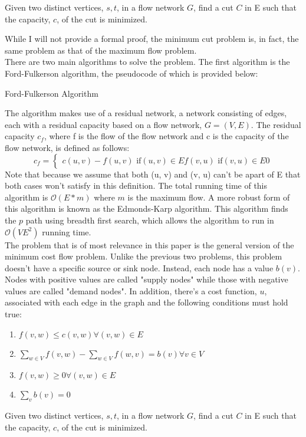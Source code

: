 \documentclass[11pt]{article}
\begin{document}
\begin{tcolorbox}
	Given two distinct vertices, $s, t$, in a flow network $G$, find  a cut $C$ in E such that the capacity, $c$, of the cut is minimized.  
\end{tcolorbox}
While I will not provide a formal proof, the minimum cut problem is, in fact, the same problem as that of the maximum flow problem. \\
There are two main algorithms to solve the problem. The first algorithm is the Ford-Fulkerson algorithm, the pseudocode of which is provided below: \\
\begin{algorithm}[H]
\caption{Ford-Fulkerson Algorithm}
\begin{algorithmic}
\EndFor
{}
\Else 
{}
\EndIf
\EndFor
\EndWhile
\end{algorithmic}
\end{algorithm}
The algorithm makes use of a residual network, a network consisting of edges, each with a residual capacity based on a flow network, $G=(V, E)$. The residual capacity $c_f$, where f is the flow of the flow network and c is the capacity of the flow network, is defined as follows:\\ 
\[
c_f = \begin{cases}
c(u, v) - f(u, v)\text{ if}  (u, v) \in E
f(v, u) \text{ if} (v, u) \in E
0
\end{cases}
\]
Note that because we assume that both (u, v) and (v, u) can't be apart of E that both cases won't satisfy in this definition. 
The total running time of this algorithm is $\mathcal{O}(E*m)$ where $m$ is the maximum flow. A more robust form of this algorithm is known as the Edmonds-Karp algorithm. This algorithm finds the $p$ path using breadth first search, which allows the algorithm to run in $\mathcal{O}(VE^2)$ running time. \\
The problem that is of most relevance in this paper is the general version of the minimum cost flow problem. Unlike the previous two problems, this problem doesn't have a specific source or sink node. Instead, each node has a value $b(v)$. Nodes with positive values are called "supply nodes" while those with negative values are called "demand nodes". In addition, there's a cost function, $u$, associated with each edge in the graph and the following conditions must hold true: 
\begin{enumerate}
\item $f(v, w) \leq c(v, w) \forall(v, w) \in E$ 
\item $\sum_{w \in V}{f(v, w)} - \sum_{w \in V}{f(w, v)} = b(v) \forall v \in V$
\item $f(v, w) \geq 0 \forall(v, w) \in E$ 
\item $\sum_{v}{b(v)} = 0$
\end{enumerate}
\begin{tcolorbox}
Given two distinct vertices, $s, t$, in a flow network $G$, find  a cut $C$ in E such that the capacity, $c$, of the cut is minimized.  
\end{tcolorbox}
\end{document}
